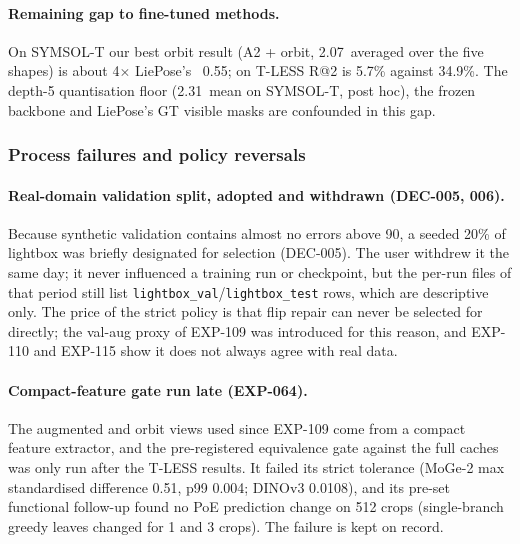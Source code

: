 \paragraph{Remaining gap to fine-tuned methods.}
On SYMSOL-T our best orbit result (A2 + orbit, 2.07\appDdeg\ averaged over the five shapes) is about 4$\times$ LiePose's~\cite{hsiao2024liepose} 0.55\appDdeg; on T-LESS R@2 is 5.7\% against 34.9\%. The depth-5 quantisation floor (2.31\appDdeg\ mean on SYMSOL-T, post hoc), the frozen backbone and LiePose's GT visible masks are confounded in this gap.

\subsubsection{Process failures and policy reversals}\label{app:log_neg_proc}

\paragraph{Real-domain validation split, adopted and withdrawn (DEC-005, 006).}
Because synthetic validation contains almost no errors above 90\appDdeg, a seeded 20\% of lightbox was briefly designated for selection (DEC-005). The user withdrew it the same day; it never influenced a training run or checkpoint, but the per-run files of that period still list \texttt{lightbox\_val}/\texttt{lightbox\_test} rows, which are descriptive only. The price of the strict policy is that flip repair can never be selected for directly; the val-aug proxy of EXP-109 was introduced for this reason, and EXP-110 and EXP-115 show it does not always agree with real data.

\paragraph{Compact-feature gate run late (EXP-064).}
The augmented and orbit views used since EXP-109 come from a compact feature extractor, and the pre-registered equivalence gate against the full caches was only run after the T-LESS results. It failed its strict tolerance (MoGe-2 max standardised difference 0.51, p99 0.004; DINOv3 0.0108), and its pre-set functional follow-up found no PoE prediction change on 512 crops (single-branch greedy leaves changed for 1 and 3 crops). The failure is kept on record.

